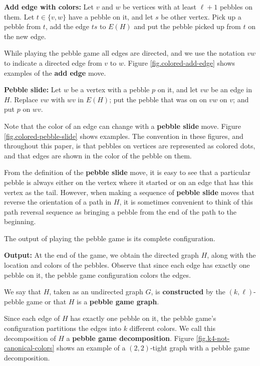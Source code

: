 \documentclass[11pt]{article}
\newcommand{\reffig}[1]{Figure \ref{fig.#1}}
\begin{document}
	{\bf Add edge with colors:} Let $v$ and $w$ be vertices with at least 
	$\ell+1$ pebbles on them. Let $t\in \{v,w\}$ have a pebble on it, and 
	let $s$ be other vertex.
	Pick up a pebble from $t$, add the edge $ts$ to $E(H)$ and put the pebble 
	picked up from $t$ on the new edge.
	
	While playing the pebble game all edges are directed, and we use the 
	notation $vw$ to indicate a directed edge from $v$ to $w$.  
	\reffig{colored-add-edge} shows examples of the {\bf add edge} move.

	{\bf Pebble slide:} Let $w$ be a vertex with a pebble $p$ 
	on it, and let $vw$ be an edge in $H$. Replace $vw$ with $wv$ in $E(H)$; 
	put the pebble that was on on $vw$ on $v$;  and put $p$ on $wv$.
	
	Note that the color of an edge can change with a {\bf pebble slide} move.
	 \reffig{colored-pebble-slide} shows examples.   The convention
	in these figures, and throughout this paper, is that pebbles on vertices
	are represented as colored dots, and that edges are shown in the color
	of the pebble on them.
	
	From the definition of the {\bf pebble slide} move, it is easy to see that 
	a particular pebble is always either on the vertex where it started or on 
	an edge that has this vertex as the tail.  However, when making a sequence 
	of {\bf pebble slide} moves that reverse the orientation of a path in $H$, 
	it is sometimes convenient to think of this path reversal sequence as 
	bringing a pebble from the end of the path to the beginning.

	The output of playing the pebble game is its complete configuration.

	{\bf Output:} At the end of the game, we obtain the directed graph $H$,
	along with the location and colors of the pebbles.  Observe that 
	since each edge has exactly one pebble on it, the pebble game configuration
	colors the edges.
	
	We say that $H$, taken as an undirected graph $G$, is {\bf constructed}
	by the $(k,\ell)$-pebble game or that $H$ is a {\bf pebble game graph}.

	Since each edge of $H$ has exactly one pebble on it, the pebble game's 
	configuration partitions the edges into $k$ different colors.  We call
	this decomposition of $H$ a {\bf pebble game decomposition}.  
	\reffig{k4-not-canonical-colors} 
	shows an example of a $(2,2)$-tight graph with a 
	pebble game decomposition.  
\end{document}
